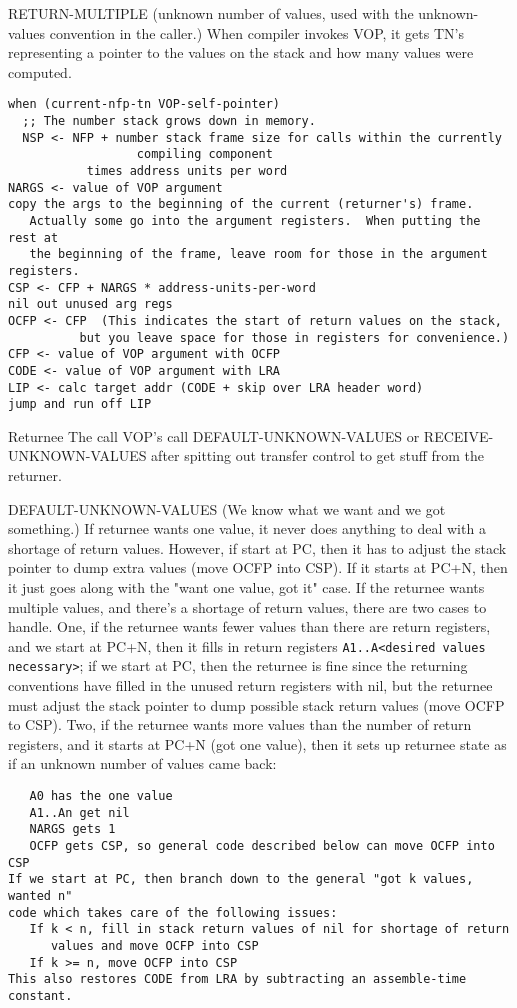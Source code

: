 RETURN-MULTIPLE
(unknown number of values, used with the unknown-values convention in
 the caller.)
When compiler invokes VOP, it gets TN's representing a pointer to the
values on the stack and how many values were computed.

\begin{verbatim}
when (current-nfp-tn VOP-self-pointer)
  ;; The number stack grows down in memory.
  NSP <- NFP + number stack frame size for calls within the currently
                  compiling component
	       times address units per word
NARGS <- value of VOP argument
copy the args to the beginning of the current (returner's) frame.
   Actually some go into the argument registers.  When putting the rest at
   the beginning of the frame, leave room for those in the argument registers.
CSP <- CFP + NARGS * address-units-per-word
nil out unused arg regs
OCFP <- CFP  (This indicates the start of return values on the stack,
	      but you leave space for those in registers for convenience.)
CFP <- value of VOP argument with OCFP
CODE <- value of VOP argument with LRA
LIP <- calc target addr (CODE + skip over LRA header word)
jump and run off LIP
\end{verbatim}

Returnee
The call VOP's call DEFAULT-UNKNOWN-VALUES or RECEIVE-UNKNOWN-VALUES after
spitting out transfer control to get stuff from the returner.

DEFAULT-UNKNOWN-VALUES
(We know what we want and we got something.)
If returnee wants one value, it never does anything to deal with a shortage
of return values.  However, if start at PC, then it has to adjust the stack
pointer to dump extra values (move OCFP into CSP).  If it starts at PC+N,
then it just goes along with the "want one value, got it" case.
If the returnee wants multiple values, and there's a shortage of return
values, there are two cases to handle.  One, if the returnee wants fewer
values than there are return registers, and we start at PC+N, then it fills
in return registers \verb|A1..A<desired values necessary>|; if we start at PC,
then the returnee is fine since the returning conventions have filled in
the unused return registers with nil, but the returnee must adjust the
stack pointer to dump possible stack return values (move OCFP to CSP).
Two, if the returnee wants more values than the number of return registers,
and it starts at PC+N (got one value), then it sets up returnee state as if
an unknown number of values came back:
\begin{verbatim}
   A0 has the one value
   A1..An get nil
   NARGS gets 1
   OCFP gets CSP, so general code described below can move OCFP into CSP
If we start at PC, then branch down to the general "got k values, wanted n"
code which takes care of the following issues:
   If k < n, fill in stack return values of nil for shortage of return
      values and move OCFP into CSP
   If k >= n, move OCFP into CSP
This also restores CODE from LRA by subtracting an assemble-time constant.
\end{verbatim}

